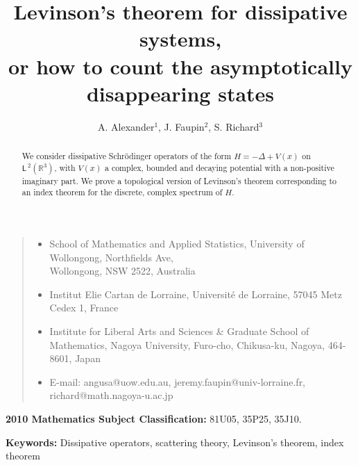 \documentclass{article}
\def\R{\mathbb R}
\def\ltwo{\mathsf{L}^{\:\!\!2}}
\begin{document}

\title{Levinson’s theorem for dissipative systems, \\
or how to count the asymptotically disappearing states}

\author{A. Alexander${}^1$, J. Faupin${}^2$, S. Richard${}^3$}


\date{\small}
\maketitle
\vspace{-1cm}

\begin{quote}
\begin{itemize}
\item[1] School of Mathematics and Applied Statistics, University of Wollongong,
Northfields Ave, \\ Wollongong, NSW 2522, Australia
\item[2] Institut Elie Cartan de Lorraine, Universit\'e de Lorraine, 57045 Metz Cedex 1,
France
\item[3] Institute for Liberal Arts and Sciences \& Graduate School of Mathematics, Nagoya University, Furo-cho, Chikusa-ku, Nagoya, 464-8601, Japan
\item[] E-mail:  angusa@uow.edu.au,  jeremy.faupin@univ-lorraine.fr, richard@math.nagoya-u.ac.jp
\end{itemize}
\end{quote}



\begin{abstract}
We consider dissipative Schr\"odinger operators of the form $H=-\Delta+V(x)$ on $\ltwo(\R^3)$, with $V(x)$ a complex, bounded and decaying potential with a non-positive imaginary part. We prove a topological version of Levinson's theorem corresponding to an index theorem for the discrete, complex spectrum of $H$.
\end{abstract}

\textbf{2010 Mathematics Subject Classification:} 81U05, 35P25, 35J10.

\smallskip

\textbf{Keywords:} Dissipative operators, scattering theory, Levinson's theorem, index theorem
\end{document}
